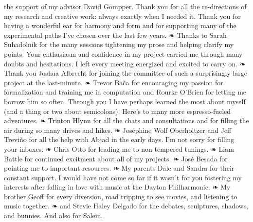 \doublespacing

 the support of my advisor David Gompper. Thank you for all the re-directions of my research and creative work: always exactly when I needed it. Thank you for having a wonderful ear for harmony and form and for supporting many of the experimental paths I've chosen over the last few years. ❧ Thanks to Sarah Suhadolnik for the many sessions tightening my prose and helping clarify my points. Your enthusiasm and confidence in my project carried me through many doubts and hesitations. I left every meeting energized and excited to carry on. ❧ Thank you Joshua Albrecht for joining the committee of such a surprisingly large project at the last-minute. ❧ Trevor Bača for encouraging my passion for formalization and training me in computation and Rourke O'Brien for letting me borrow him so often. Through you I have perhaps learned the most about myself (and a thing or two about semicolons). Here's to many more espresso-fueled adventures. ❧ Trinton Hlynn for all the chats and consultations and for filling the air during so many drives and hikes. ❧ Joséphine Wolf Oberholtzer and Jeff Treviño for all the help with Abjad in the early days. I'm not sorry for filling your inboxes. ❧ Chris Otto for leading me to non-tempered tunings. ❧ Liam Battle for continued excitment about all of my projects. ❧ José Besada for pointing me to important resources. ❧ My parents Dale and Sandra for their constant support. I would have not come so far if it wasn't for you fostering my interests after falling in love with music at the Dayton Philharmonic. ❧ My brother Geoff for every diversion, road tripping to see movies, and listening to music together. ❧ and Stevie Haley Delgado for the debates, sculptures, shadows, and bunnies. And also for Salem.

